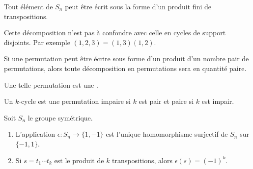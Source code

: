 \begin{proposition} \label{PropPWIJbu}
    Tout élément de \( S_n\) peut être écrit sous la forme d'un produit fini de transpositions.
\end{proposition}
Cette décomposition n'est pas à confondre avec celle en cycles de support disjoints. Par exemple \( (1,2,3)=(1,3)(1,2)\).

\begin{propositionDef}\label{PROPooKRHEooAxtmRv}
    Si une permutation peut être écrire sous forme d'un produit d'un nombre pair de permutations, alors toute décomposition en permutations sera en quantité paire.

    Une telle permutation est une .
\end{propositionDef}

\begin{lemma}       \label{LemhxnkMf}
    Un \( k\)-cycle est une permutation impaire si \( k\) est pair et paire si \( k\) est impair.
\end{lemma}

\begin{proposition}  \label{ProphIuJrC}
    Soit \( S_n\) le groupe symétrique.
    \begin{enumerate}
        \item       \label{ITEMooBQKUooFTkvSu}
            L'application \( \epsilon\colon S_n\to \{ 1,-1 \}\) est l'unique homomorphisme surjectif de \( S_n\) sur \( \{ -1,1 \}\).
        \item
            Si \( s=t_1\cdots t_k\) est le produit de \( k\) transpositions, alors \( \epsilon(s)=(-1)^k\).
    \end{enumerate}
\end{proposition}

